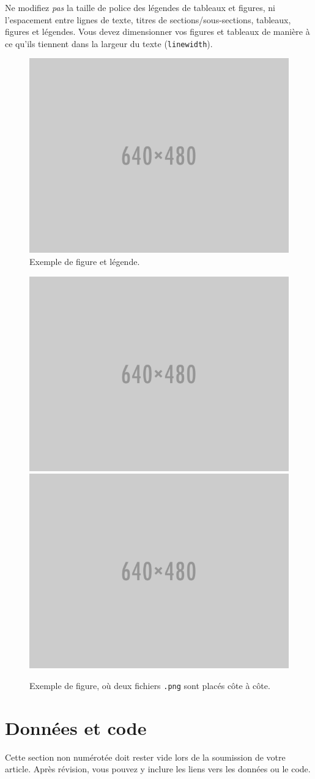\documentclass[fra]{anthology-ch}         %
\begin{document}
Ne modifiez \textit{pas} la taille de police des légendes de tableaux et figures, ni l’espacement entre lignes de texte, titres de sections/sous-sections, tableaux, figures et légendes. Vous devez dimensionner vos figures et tableaux de manière à ce qu’ils tiennent dans la largeur du texte (\texttt{linewidth}). 

\begin{figure}[t!]
  \centering
  \includegraphics[width=0.4\linewidth]{640x480.png}
  \caption{Exemple de figure et légende.}
  \label{fig:example}
\end{figure}

\begin{figure}[t!]
  \centering
  \includegraphics[width=0.4\linewidth]{640x480.png}
  \includegraphics[width=0.4\linewidth]{640x480.png}
  \caption{Exemple de figure, où deux fichiers \texttt{.png} sont placés côte à côte.}
  \label{fig:example_bigger}
\end{figure}

\section*{Données et code}

Cette section non numérotée doit rester vide lors de la soumission de votre article. Après révision, vous pouvez y inclure les liens vers les données ou le code.
\end{document}
